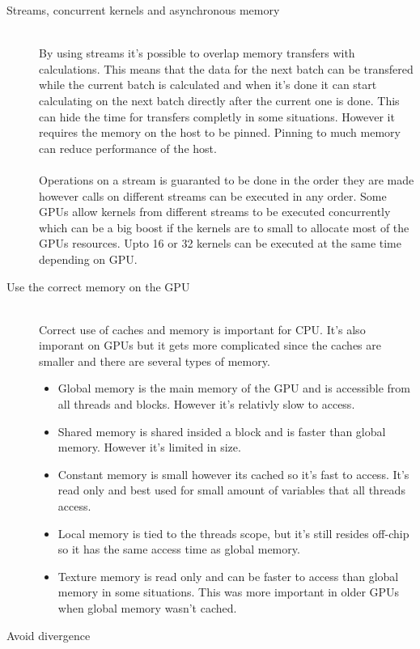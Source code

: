 \documentclass[10pt,a4paper]{article}
\begin{document}
\begin{description}
  \item[Streams, concurrent kernels and asynchronous memory] \hfill \\
  By using streams it's possible to overlap memory transfers with calculations. This means that the data for the next batch can be transfered while the current batch is calculated and when it's done it can start calculating on the next batch directly after the current one is done. This can hide the time for transfers completly in some situations. However it requires the memory on the host to be pinned. Pinning to much memory can reduce performance of the host.\cite{cuda}\\
  \\
  Operations on a stream is guaranted to be done in the order they are made however calls on different streams can be executed in any order. Some GPUs allow kernels from different streams to be executed concurrently which can be a big boost if the kernels are to small to allocate most of the GPUs resources. Upto 16 or 32 kernels can be executed at the same time depending on GPU.\cite{cuda}
  \item[Use the correct memory on the GPU] \hfill \\
  Correct use of caches and memory is important for CPU\cite{drepper2007cpumemory}. It's also imporant on GPUs but it gets more complicated since the caches are smaller and there are several types of memory.
    \begin{itemize}
    \item Global memory is the main memory of the GPU and is accessible from all threads and blocks. However it's relativly slow to access.
    \item Shared memory is shared insided a block and is faster than global memory. However it's limited in size.
    \item Constant memory is small however its cached so it's fast to access. It's read only and best used for small amount of variables that all threads access.
    \item Local memory is tied to the threads scope, but it's still resides off-chip so it has the same access time as global memory.
    \item Texture memory is read only and can be faster to access than global memory in some situations. This was more important in older GPUs when global memory wasn't cached.\cite{plink_gpu, cuda}
  \end{itemize}
  \item[Avoid divergence] \hfill \\

\end{description}
\end{document}
